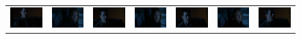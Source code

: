 \begin{figure}
\begin{center}
\begin{tabular}{c c c c c c c}
\includegraphics[width=0.11\linewidth]
  {fig/pat1/breach/01.jpg}
& \includegraphics[width=0.11\linewidth]
  {fig/pat1/breach/02.jpg}
& \includegraphics[width=0.11\linewidth]
  {fig/pat1/breach/03.jpg}
& \includegraphics[width=0.11\linewidth]
  {fig/pat1/breach/04.jpg}
& \includegraphics[width=0.11\linewidth]
  {fig/pat1/breach/05.jpg}
& \includegraphics[width=0.11\linewidth]
  {fig/pat1/breach/06.jpg}
& \includegraphics[width=0.11\linewidth]
  {fig/pat1/breach/07.jpg}
\\


\end{tabular}
\end{center}
\end{figure}
